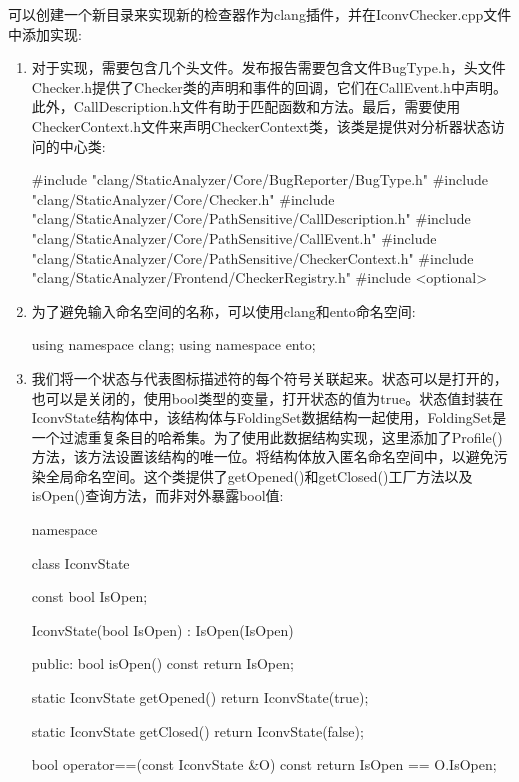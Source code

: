 可以创建一个新目录来实现新的检查器作为clang插件，并在IconvChecker.cpp文件中添加实现:

\begin{enumerate}
\item
对于实现，需要包含几个头文件。发布报告需要包含文件BugType.h，头文件Checker.h提供了Checker类的声明和事件的回调，它们在CallEvent.h中声明。此外，CallDescription.h文件有助于匹配函数和方法。最后，需要使用CheckerContext.h文件来声明CheckerContext类，该类是提供对分析器状态访问的中心类:

\begin{cpp}
#include "clang/StaticAnalyzer/Core/BugReporter/BugType.h"
#include "clang/StaticAnalyzer/Core/Checker.h"
#include "clang/StaticAnalyzer/Core/PathSensitive/CallDescription.h"
#include "clang/StaticAnalyzer/Core/PathSensitive/CallEvent.h"
#include "clang/StaticAnalyzer/Core/PathSensitive/CheckerContext.h"
#include "clang/StaticAnalyzer/Frontend/CheckerRegistry.h"
#include <optional>
\end{cpp}

\item
为了避免输入命名空间的名称，可以使用clang和ento命名空间:

\begin{cpp}
using namespace clang;
using namespace ento;
\end{cpp}

\item
我们将一个状态与代表图标描述符的每个符号关联起来。状态可以是打开的，也可以是关闭的，使用bool类型的变量，打开状态的值为true。状态值封装在IconvState结构体中，该结构体与FoldingSet数据结构一起使用，FoldingSet是一个过滤重复条目的哈希集。为了使用此数据结构实现，这里添加了Profile()方法，该方法设置该结构的唯一位。将结构体放入匿名命名空间中，以避免污染全局命名空间。这个类提供了getOpened()和getClosed()工厂方法以及isOpen()查询方法，而非对外暴露bool值:

\begin{cpp}
namespace {
class IconvState {
    const bool IsOpen;

    IconvState(bool IsOpen) : IsOpen(IsOpen) {}

public:
    bool isOpen() const { return IsOpen; }

    static IconvState getOpened() {
        return IconvState(true);
    }

    static IconvState getClosed() {
        return IconvState(false);
    }

    bool operator==(const IconvState &O) const {
        return IsOpen == O.IsOpen;
    }

}}
\end{cpp}
\end{enumerate}
